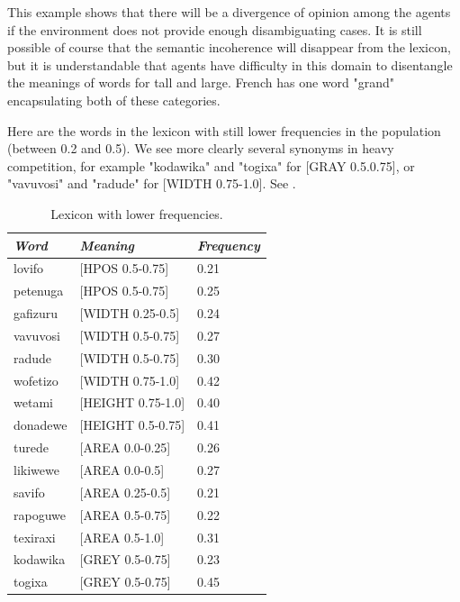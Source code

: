 This example shows that there will be a divergence of 
opinion among the agents if the environment does not 
provide enough 
disambiguating cases. It is still possible of course that 
the semantic incoherence will disappear from the lexicon, 
but it is understandable that agents have difficulty 
in this domain to disentangle the meanings of words for 
tall and large. French has one word "grand" encapsulating
both of these categories.

Here are the words in the lexicon with still lower 
frequencies in the population (between 0.2 and 0.5). We see
more clearly several synonyms in heavy competition, for example 
"kodawika" and "togixa" for [GRAY 0.5.0.75], or 
"vavuvosi" and "radude" for [WIDTH 0.75-1.0]. See . 
\begin{table}
\begin{center}
\begin{tabular}{ l  l  l }
\lsptoprule
{\it Word}&{\it Meaning} & {\it Frequency} \\ \midrule
lovifo & [HPOS 0.5-0.75] & 0.21 \\ \midrule
petenuga & [HPOS 0.5-0.75] & 0.25 \\ \midrule
gafizuru & [WIDTH 0.25-0.5] & 0.24 \\ \midrule
vavuvosi & [WIDTH 0.5-0.75] & 0.27 \\ \midrule
radude & [WIDTH 0.5-0.75] & 0.30 \\ \midrule
wofetizo & [WIDTH 0.75-1.0] & 0.42 \\ \midrule
wetami & [HEIGHT 0.75-1.0] & 0.40 \\ \midrule
donadewe & [HEIGHT 0.5-0.75] & 0.41 \\ \midrule
turede & [AREA 0.0-0.25] & 0.26 \\ \midrule
likiwewe & [AREA 0.0-0.5] & 0.27 \\ \midrule
savifo & [AREA 0.25-0.5] & 0.21 \\ \midrule
rapoguwe & [AREA 0.5-0.75] & 0.22 \\ \midrule
texiraxi & [AREA 0.5-1.0] & 0.31 \\ \midrule
kodawika & [GREY 0.5-0.75] & 0.23 \\ \midrule
togixa & [GREY 0.5-0.75] & 0.45 \\ \midrule
\end{tabular}
\caption{\label{tab:comp} Lexicon with lower frequencies.}
\end{center}
\end{table}

